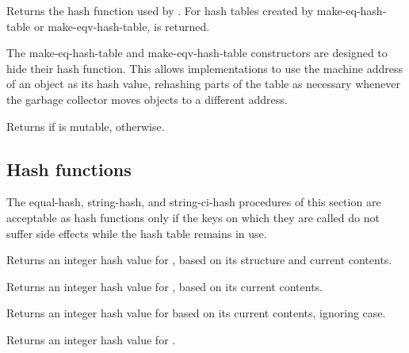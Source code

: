 \begin{entry}{}
Returns the hash function used by .  For hash tables created by {\cf make-eq-hash-table} 
or {\cf make-eqv-hash-table}, \schfalse{} is returned.

\begin{rationale}
The {\cf make-eq-hash-table} and {\cf make-eqv-hash-table} constructors
are designed to hide their hash function.  This allows implementations
to use the machine address of an object as its hash value, rehashing
parts of the table as necessary whenever the garbage collector moves
objects to a different address.
\end{rationale}
\end{entry}

\begin{entry}{}
Returns \schtrue{} if  is mutable, \schfalse{} otherwise.
\end{entry}

\subsection{Hash functions}

The {\cf equal-hash}, {\cf string-hash}, and {\cf string-ci-hash}
procedures of this section are acceptable as hash functions only
if the keys on which they are called do not suffer side effects
while the hash table remains in use.

\begin{entry}{}
Returns an integer hash value for , based on its structure and current contents.
\end{entry}

\begin{entry}{}
Returns an integer hash value for , based on its current contents.
\end{entry}

\begin{entry}{}
Returns an integer hash value for  based on its current contents, ignoring case.
\end{entry}

\begin{entry}{}
Returns an integer hash value for .
\end{entry}

